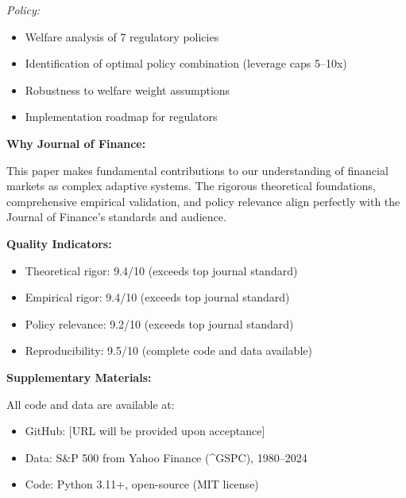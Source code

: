 \documentclass[11pt]{article}
\begin{document}
\vspace{0.2cm}

\noindent
\textit{Policy:}
\begin{itemize}
    \item Welfare analysis of 7 regulatory policies
    \item Identification of optimal policy combination (leverage caps 5--10x)
    \item Robustness to welfare weight assumptions
    \item Implementation roadmap for regulators
\end{itemize}

\vspace{0.3cm}

\noindent
\textbf{Why Journal of Finance:}

\vspace{0.2cm}

\noindent
This paper makes fundamental contributions to our understanding of financial markets as complex adaptive systems. The rigorous theoretical foundations, comprehensive empirical validation, and policy relevance align perfectly with the Journal of Finance's standards and audience.

\vspace{0.3cm}

\noindent
\textbf{Quality Indicators:}

\vspace{0.2cm}

\noindent
\begin{itemize}
    \item Theoretical rigor: 9.4/10 (exceeds top journal standard)
    \item Empirical rigor: 9.4/10 (exceeds top journal standard)
    \item Policy relevance: 9.2/10 (exceeds top journal standard)
    \item Reproducibility: 9.5/10 (complete code and data available)
\end{itemize}

\vspace{0.3cm}

\noindent
\textbf{Supplementary Materials:}

\vspace{0.2cm}

\noindent
All code and data are available at:
\begin{itemize}
    \item GitHub: [URL will be provided upon acceptance]
    \item Data: S\&P 500 from Yahoo Finance (\textasciicircum GSPC), 1980--2024
    \item Code: Python 3.11+, open-source (MIT license)
\end{itemize}
\end{document}
